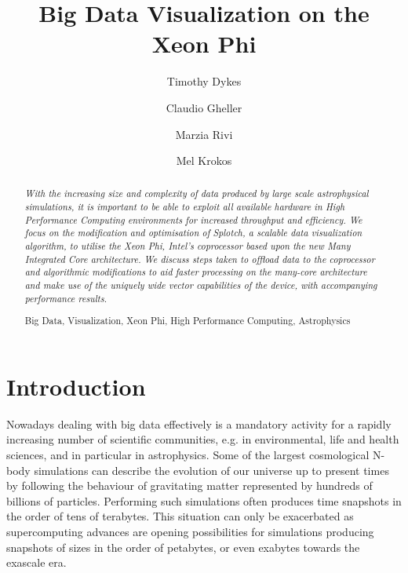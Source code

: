 \documentclass[runningheads,a4paper]{llncs}
\newcommand{\keywords}[1]{\par\addvspace\baselineskip
\noindent\keywordname\enspace\ignorespaces#1}
\begin{document}
\mainmatter  %

\title{Big Data Visualization on the Xeon Phi}

\author{Timothy Dykes
\and Claudio Gheller
\and Marzia Rivi
\and Mel Krokos
}

\institute{   
   University of Portsmouth,
   Portsmouth, U.K.\\
\mailsa\\
\and
  CSCS-ETHZ,
  Lugano, Switzerland\\
  \email{cgheller@cscs.ch}
\and
   University of Oxford,
   Oxford, U.K.\\
   \email{rivi@physics.ox.ac.uk}\\
}
\maketitle


\begin{abstract}
\emph{With the increasing size and complexity of data produced by large scale astrophysical simulations, 
it is important to be able to exploit all available hardware in High Performance Computing environments 
for increased throughput and efficiency. We focus on the modification and optimisation of Splotch, a 
scalable data visualization algorithm, to utilise the Xeon Phi, Intel's coprocessor based upon the new 
Many Integrated Core architecture. We discuss steps taken to offload data to the coprocessor and 
algorithmic modifications to aid faster processing on the many-core architecture and make use of the 
uniquely wide vector capabilities of the device, with accompanying performance results.}

\keywords Big Data, Visualization, Xeon Phi, High Performance Computing, Astrophysics
\end{abstract}


\section{Introduction}
\label{sect:introduction}

Nowadays dealing with big data effectively is a mandatory activity for a rapidly increasing number of scientific communities,
e.g. in environmental, life and health sciences, and in particular in astrophysics. Some of the largest cosmological N-body
simulations can describe the evolution of our universe up to present times by following the behaviour of gravitating matter
represented by hundreds of billions of particles. Performing such simulations often produces time snapshots in the order of tens
of terabytes. This situation can only be exacerbated as supercomputing advances are opening possibilities for simulations
producing snapshots of sizes in the order of petabytes, or even exabytes towards the exascale era.
\end{document}
